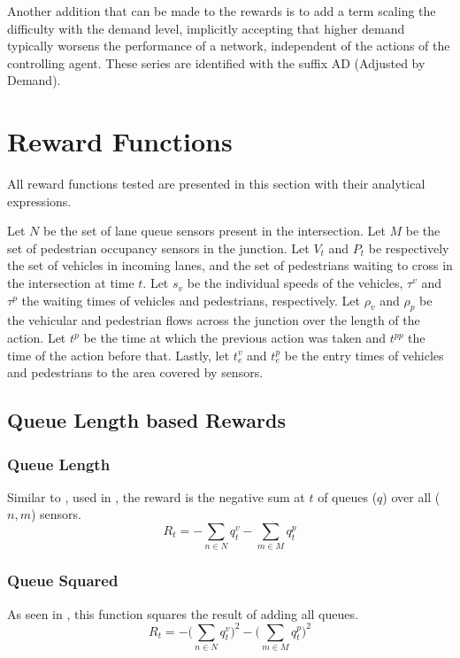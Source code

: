\documentclass[conference]{IEEEtran}
\begin{document}
Another addition that can be made to the rewards is to add a term scaling the difficulty with the demand level, implicitly accepting that higher demand typically worsens the performance of a network, independent of the actions of the controlling agent.
These series are identified with the suffix AD (Adjusted by Demand).
\section{Reward Functions}
\label{rewards}
All reward functions tested are presented in this section with their analytical expressions.

Let $N$ be the set of lane queue sensors present in the intersection.
Let $M$ be the set of pedestrian occupancy sensors in the junction.
Let $V_t$ and $P_t$ be respectively the set of vehicles in incoming lanes, and the set of pedestrians waiting to cross in the intersection at time $t$. 
Let $s_v$ be the individual speeds of the vehicles, $\tau^v$ and $\tau^p$ the waiting times of vehicles and pedestrians, respectively.
Let $\rho_v$ and $\rho_p$ be the vehicular and pedestrian flows across the junction over the length of the action.
Let $t^p$ be the time at which the previous action was taken and $t^{pp}$ the time of the action before that.
Lastly, let $t^v_e$ and $t^p_e$ be the entry times of vehicles and pedestrians to the area covered by sensors. 

\subsection{Queue Length based Rewards}
\subsubsection{Queue Length}
Similar to \cite{pra2010}, used in \cite{aslani2019}, the reward is the negative sum at $t$ of queues ($q$) over all ($n,m$) sensors.
\begin{equation}
    R_t = - \sum_{n \in N} q^v_{t} - \sum_{m \in M} q^p_{t}
\label{eq:queue}
\end{equation}

\subsubsection{Queue Squared}
As seen in \cite{gendersthesis}, this function squares the result of adding all queues.
\begin{equation}
   R_t = -  \bigg( \sum_{n \in N} q^v_{t} \bigg)^2 - \bigg( \sum_{m \in M} q^p_{t} \bigg)^2
\label{eq:queuesq} 
\end{equation}
\end{document}
